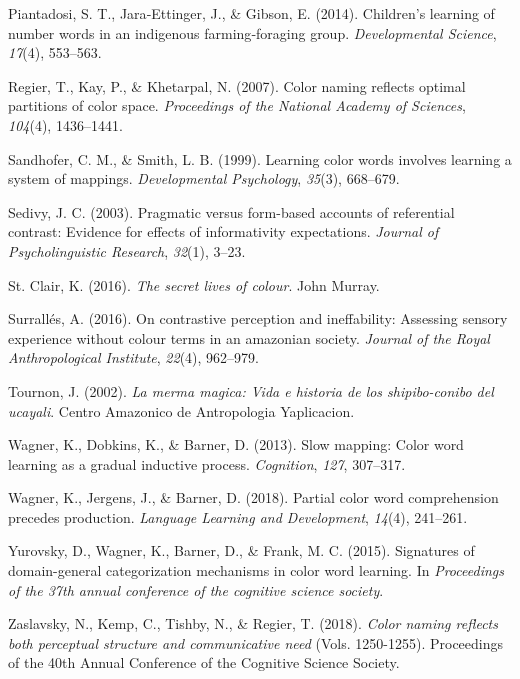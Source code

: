 \documentclass[
  english,
  ,man,floatsintext]{apa6}
\begin{document}
\leavevmode\hypertarget{ref-piantadosi2014}{}%
Piantadosi, S. T., Jara‐Ettinger, J., \& Gibson, E. (2014). Children's learning of number words in an indigenous farming‐foraging group. \emph{Developmental Science}, \emph{17}(4), 553--563.

\leavevmode\hypertarget{ref-regier2007}{}%
Regier, T., Kay, P., \& Khetarpal, N. (2007). Color naming reflects optimal partitions of color space. \emph{Proceedings of the National Academy of Sciences}, \emph{104}(4), 1436--1441.

\leavevmode\hypertarget{ref-sandhofer1999}{}%
Sandhofer, C. M., \& Smith, L. B. (1999). Learning color words involves learning a system of mappings. \emph{Developmental Psychology}, \emph{35}(3), 668--679.

\leavevmode\hypertarget{ref-sedivy2003}{}%
Sedivy, J. C. (2003). Pragmatic versus form-based accounts of referential contrast: Evidence for effects of informativity expectations. \emph{Journal of Psycholinguistic Research}, \emph{32}(1), 3--23.

\leavevmode\hypertarget{ref-stclair2016}{}%
St. Clair, K. (2016). \emph{The secret lives of colour}. John Murray.

\leavevmode\hypertarget{ref-surralles2016}{}%
Surrallés, A. (2016). On contrastive perception and ineffability: Assessing sensory experience without colour terms in an amazonian society. \emph{Journal of the Royal Anthropological Institute}, \emph{22}(4), 962--979.

\leavevmode\hypertarget{ref-tournon2002}{}%
Tournon, J. (2002). \emph{La merma magica: Vida e historia de los shipibo-conibo del ucayali}. Centro Amazonico de Antropologia Yaplicacion.

\leavevmode\hypertarget{ref-wagner2013}{}%
Wagner, K., Dobkins, K., \& Barner, D. (2013). Slow mapping: Color word learning as a gradual inductive process. \emph{Cognition}, \emph{127}, 307--317.

\leavevmode\hypertarget{ref-wagner2018}{}%
Wagner, K., Jergens, J., \& Barner, D. (2018). Partial color word comprehension precedes production. \emph{Language Learning and Development}, \emph{14}(4), 241--261.

\leavevmode\hypertarget{ref-yurovsky2015}{}%
Yurovsky, D., Wagner, K., Barner, D., \& Frank, M. C. (2015). Signatures of domain-general categorization mechanisms in color word learning. In \emph{Proceedings of the 37th annual conference of the cognitive science society}.

\leavevmode\hypertarget{ref-zaslavsky2018}{}%
Zaslavsky, N., Kemp, C., Tishby, N., \& Regier, T. (2018). \emph{Color naming reflects both perceptual structure and communicative need} (Vols. 1250-1255). Proceedings of the 40th Annual Conference of the Cognitive Science Society.

\endgroup
\end{document}
